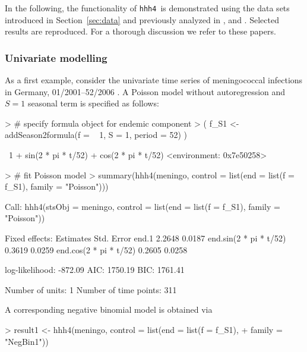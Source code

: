 \documentclass[a4paper,11pt]{article}
\newcommand{\hhh}{\texttt{hhh4}}
\begin{document}
In the following, the functionality of \hhh\ is demonstrated using
the data sets introduced in Section~\ref{sec:data}
and previously analyzed in \cite{paul-etal-2008}, \cite{paul-held-2011} and 
\cite{herzog-etal-2010}.
Selected results are reproduced. For a thorough discussion 
we refer to these papers.

\subsubsection{Univariate modelling}

As a first example, consider the univariate time series of meningococcal infections
in Germany, 01/2001--52/2006 \citep[cf.~Tab.~1 in ][]{paul-etal-2008}.
A Poisson model without autoregression and $S=1$ seasonal term is specified 
as follows:
\begin{Schunk}
\begin{Sinput}
> # specify formula object for endemic component
> ( f_S1 <- addSeason2formula(f = ~ 1, S = 1, period = 52) )
\end{Sinput}
\begin{Soutput}
~1 + sin(2 * pi * t/52) + cos(2 * pi * t/52)
<environment: 0x7e50258>
\end{Soutput}
\begin{Sinput}
> # fit Poisson model
> summary(hhh4(meningo, control = list(end = list(f = f_S1), family = "Poisson")))
\end{Sinput}
\begin{Soutput}
Call: 
hhh4(stsObj = meningo, control = list(end = list(f = f_S1), family = "Poisson"))


Fixed effects: 
                        Estimates  Std. Error
end.1                      2.2648      0.0187
end.sin(2 * pi * t/52)     0.3619      0.0259
end.cos(2 * pi * t/52)     0.2605      0.0258

log-likelihood:    -872.09 
AIC:               1750.19 
BIC:               1761.41 

Number of units:          1 
Number of time points:    311 
\end{Soutput}
\end{Schunk}
A corresponding negative binomial model is obtained via
\begin{Schunk}
\begin{Sinput}
> result1 <- hhh4(meningo, control = list(end = list(f = f_S1), 
+                                         family = "NegBin1")) 
\end{Sinput}
\end{Schunk}
\end{document}
